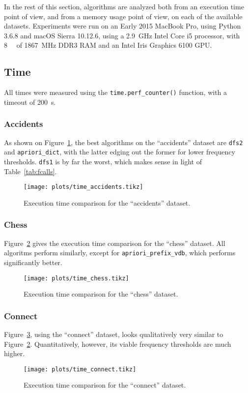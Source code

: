\documentclass[journal, 9pt]{IEEEtran}
\theoremstyle{definition}
\newcommand{\py}[1]{\texttt{#1}}
\begin{document}
In the rest of this section, algorithms are analyzed both from an execution time point of view, and from a memory usage point of view, on each of the available datasets.
Experiments were run on an Early 2015 MacBook Pro, using Python 3.6.8 and macOS Sierra 10.12.6, using a \SI{2.9}{\giga\hertz} Intel Core i5 processor, with \SI{8}{\giga\byte} of \SI{1867}{\mega\hertz} DDR3 RAM and an Intel Iris Graphics 6100 GPU.

\subsection{Time}
All times were measured using the \py{time.perf_counter()} function, with a timeout of \SI{200}{\second}.

\subsubsection{Accidents}
As shown on Figure~\ref{fig:time_accidents}, the best algorithms on the ``accidents'' dataset are \py{dfs2} and \py{apriori_dict}, with the latter edging out the former for lower frequency thresholds.
\py{dfs1} is by far the worst, which makes sense in light of Table~\ref{tab:fcalls}.
\begin{figure}[!hbtp]
	\centering
	\texttt{[image: plots/time\_accidents.tikz]}
	\caption{Execution time comparison for the ``accidents'' dataset.}
	\label{fig:time_accidents}
\end{figure}

\subsubsection{Chess}
Figure~\ref{fig:time_chess} gives the execution time comparison for the ``chess'' dataset.
All algoritms perform similarly, except for \py{apriori_prefix_vdb}, which performs significantly better.
\begin{figure}[!hbtp]
	\centering
	\texttt{[image: plots/time\_chess.tikz]}
	\caption{Execution time comparison for the ``chess'' dataset.}
	\label{fig:time_chess}
\end{figure}

\subsubsection{Connect}
Figure~\ref{fig:time_connect}, using the ``connect'' dataset, looks qualitatively very similar to Figure~\ref{fig:time_chess}.
Quantitatively, however, its viable frequency thresholds are much higher.
\begin{figure}[!hbtp]
	\centering
	\texttt{[image: plots/time\_connect.tikz]}
	\caption{Execution time comparison for the ``connect'' dataset.}
	\label{fig:time_connect}
\end{figure}
\end{document}
